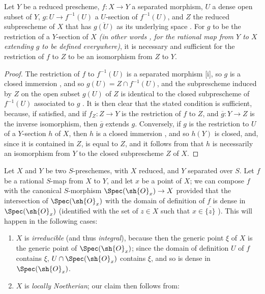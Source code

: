 \begin{corollary}[7.2.7]
\label{I.7.2.7}
Let $Y$ be a reduced prescheme, $f:X\to Y$ a separated morphism, $U$ a dense open subset of $Y$, $g:U\to f^{-1}(U)$ a $U$-section of $f^{-1}(U)$, and $Z$ the reduced subprescheme of $X$ that has $\overline{g(U)}$ as its underlying space .
For $g$ to be the restriction of a $Y$-section of $X$ \emph{(in other words , for the rational map from $Y$ to $X$ extending $g$ to be defined everywhere)}, it is necessary and sufficient for the restriction of $f$ to $Z$ to be an isomorphism from $Z$ to $Y$.
\end{corollary}

\begin{proof}
The restriction of $f$ to $f^{-1}(U)$ is a separated morphism [i], so $g$ is a closed immersion , and so $g(U)=Z\cap f^{-1}(U)$, and the subprescheme induced by $Z$ on the open subset $g(U)$ of $Z$ is identical to the closed subprescheme of $f^{-1}(U)$ associated to $g$ .
It is then clear that the stated condition is sufficient, because, if satisfied, and if $f_Z:Z\to Y$ is the restriction of $f$ to $Z$, and $\overline{g}:Y\to Z$ is the inverse isomorphism, then $\overline{g}$ extends $g$.
Conversely, if $g$ is the restriction to $U$ of a $Y$-section $h$ of $X$, then $h$ is a closed immersion , and so $h(Y)$ is closed, and, since it is contained in $Z$, is equal to $Z$, and it follows from  that $h$ is necessarily an isomorphism from $Y$ to the closed subprescheme $Z$ of $X$.
\end{proof}

\begin{env}[7.2.8]
\label{I.7.2.8}
Let $X$ and $Y$ be two $S$-preschemes, with $X$ reduced, and $Y$ separated over $S$.
Let $f$ be a rational $S$-map from $X$ to $Y$, and let $x$ be a point of $X$; we can compose $f$ with the canonical $S$-morphism $\Spec(\sh{O}_x)\to X$  provided that the intersection of $\Spec(\sh{O}_x)$ with the domain of definition of $f$ is dense in $\Spec(\sh{O}_x)$ (identified with the set of $z\in X$ such that $x\in\overline{\{z\}}$ ).
This will happen in the following cases:
\begin{enumerate}
  \item[1st.] $X$ is \emph{irreducible} (and thus \emph{integral}), because then the generic point $\xi$ of $X$ is the generic point of $\Spec(\sh{O}_x)$; since the domain of definition $U$ of $f$ contains $\xi$, $U\cap\Spec(\sh{O}_x)$ contains $\xi$, and so is dense in $\Spec(\sh{O}_x)$.
  \item[2nd.] $X$ is \emph{locally Noetherian}; our claim then follows from:
\end{enumerate}
\end{env}

